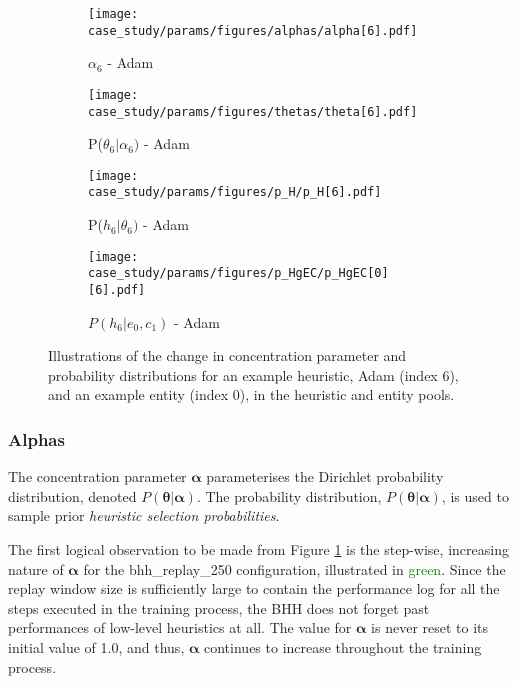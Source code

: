 \begin{figure}[H]
	\begin{subfigure}{0.5\textwidth}
		\centering
		\texttt{[image: case\_study/params/figures/alphas/alpha[6].pdf]}
		\caption{$\alpha_{6}$ - \acs{Adam}}
		\label{fig:results:case_study:alphas:6}
	\end{subfigure}
	\begin{subfigure}{0.5\textwidth}
		\centering
		\texttt{[image: case\_study/params/figures/thetas/theta[6].pdf]}
		\caption{P($\theta_{6} \vert \alpha_{6})$ - \acs{Adam}}
		\label{fig:results:case_study:thetas:6}
	\end{subfigure}
	\par\bigskip
	\begin{subfigure}{0.5\textwidth}
		\centering
		\texttt{[image: case\_study/params/figures/p\_H/p\_H[6].pdf]}
		\caption{P($h_{6} \vert \theta_{6})$ - \acs{Adam}}
		\label{fig:results:case_study:p_H:6}
	\end{subfigure}
	\begin{subfigure}{0.5\textwidth}
		\centering
		\texttt{[image: case\_study/params/figures/p\_HgEC/p\_HgEC[0][6].pdf]}
		\caption{$P(h_{6} \vert e_{0}, c_{1})$ - \acs{Adam}}
		\label{fig:results:case_study:p_HgEC:0:6}
	\end{subfigure}
	\par\bigskip
	\caption{Illustrations of the change in concentration parameter and probability distributions for an example heuristic, \acs{Adam} (index 6), and an example entity (index 0), in the heuristic and entity pools.}
	\label{fig:results:case_study}
\end{figure}

\subsubsection{Alphas}\label{sec:results:case_study:alphas}

The concentration parameter $\boldsymbol{\alpha}$ parameterises the Dirichlet probability distribution, denoted $P(\boldsymbol{\theta} \vert \boldsymbol{\alpha})$. The probability distribution, $P(\boldsymbol{\theta} \vert \boldsymbol{\alpha})$, is used to sample prior \textit{heuristic selection probabilities}.

The first logical observation to be made from Figure \ref{fig:results:case_study:alphas:6} is the step-wise, increasing nature of $\boldsymbol{\alpha}$ for the bhh\_replay\_250 configuration, illustrated in \textcolor{green}{green}. Since the replay window size is sufficiently large to contain the performance log for all the steps executed in the training process, the \acs{BHH} does not forget past performances of low-level heuristics at all. The value for $\boldsymbol{\alpha}$ is never reset to its initial value of 1.0, and thus, $\boldsymbol{\alpha}$ continues to increase throughout the training process.

